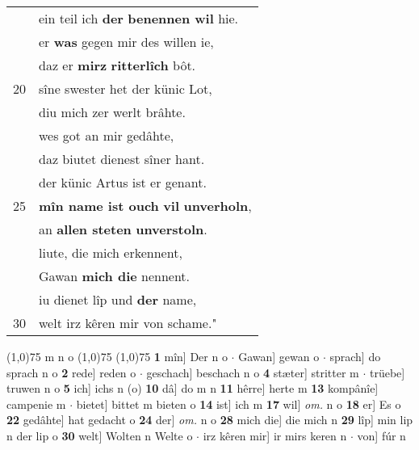 \documentclass[8pt,a4paper,notitlepage]{article}
\begin{document}
\begin{table}[ht]
\begin{minipage}[t]{0.5\linewidth}
\begin{tabular}{rl}
 & ein teil ich \textbf{der} \textbf{benennen wil} hie.\\ 
 & er \textbf{was} gegen mir des willen ie,\\ 
 & daz er \textbf{mirz} \textbf{ritterlîch} bôt.\\ 
20 & sîne swester het der künic Lot,\\ 
 & diu mich zer werlt brâhte.\\ 
 & wes got an mir gedâhte,\\ 
 & daz biutet dienest sîner hant.\\ 
 & der künic Artus ist er genant.\\ 
25 & \textbf{mîn name ist ouch} \textbf{vil} \textbf{unverholn},\\ 
 & an \textbf{allen steten} \textbf{unverstoln}.\\ 
 & liute, die mich erkennent,\\ 
 & Gawan \textbf{mich die} nennent.\\ 
 & iu dienet lîp und \textbf{der} name,\\ 
30 & welt irz kêren mir von schame."\\ 
\end{tabular}
\scriptsize
\line(1,0){75} \newline
m n o \newline
\line(1,0){75} \newline
\newline
\line(1,0){75} \newline
\textbf{1} mîn] Der n o  $\cdot$ Gawan] gewan o  $\cdot$ sprach] do sprach n o \textbf{2} rede] reden o  $\cdot$ geschach] beschach n o \textbf{4} stæter] stritter m  $\cdot$ trüebe] truwen n o \textbf{5} ich] ichs n (o) \textbf{10} dâ] do m n \textbf{11} hêrre] herte m \textbf{13} kompânîe] campenie m  $\cdot$ bietet] bittet m bieten o \textbf{14} ist] ich m \textbf{17} wil] \textit{om.} n o \textbf{18} er] Es o \textbf{22} gedâhte] hat gedacht o \textbf{24} der] \textit{om.} n o \textbf{28} mich die] die mich n \textbf{29} lîp] min lip n der lip o \textbf{30} welt] Wolten n Welte o  $\cdot$ irz kêren mir] ir mirs keren n  $\cdot$ von] fúr n \newline
\end{minipage}
\end{table}
\newpage
\end{document}
